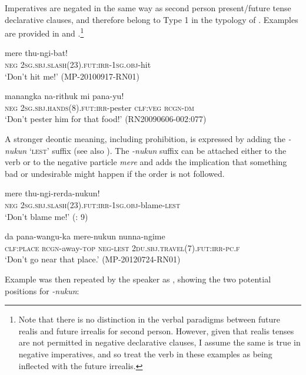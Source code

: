 \documentclass[output=paper,colorlinks,citecolor=brown]{langscibook}
\begin{document}
Imperatives are negated in the same way as second person present/future tense declarative clauses, and therefore belong to Type 1 in the typology of \citet{AuweraEtAl2013}. Examples are provided in  and .\footnote{Note that there is no distinction in the verbal paradigms between future realis and future irrealis for second person. However, given that realis tenses are not permitted in negative declarative clauses, I assume the same is true in negative imperatives, and so treat the verb in these examples as being inflected with the future irrealis.}

\ea\label{ex:mur:19}
    \gll  mere thu-ngi-bat!\\
         \textsc{neg} \textsc{2sg.sbj.slash(23).fut:irr-1sg.obj}{}-hit\\
    \glt ‘Don't hit me!’ (MP-20100917-RN01)
\z 

\ea\label{ex:mur:20}
    \gll manangka na{}-rithuk mi pana-yu!\\
         \textsc{neg} \textsc{2sg.sbj.hands(8).fut:irr}{}-pester \textsc{clf:veg} \textsc{rcgn-dm}\\
    \glt ‘Don’t pester him for that food!’ (RN20090606-002:077)
\z 
         
A stronger deontic meaning, including prohibition, is expressed by adding the \textit{{}-nukun} ‘\textsc{lest}’ suffix (see also ). The \textit{{}-nukun} suffix can be attached either to the verb  or to the negative particle \textit{mere}  and adds the implication that something bad or undesirable might happen if the order is not followed.


\ea\label{ex:mur:21}
    \gll mere thu{}-ngi-rerda-nukun!\\
          \textsc{neg} \textsc{2sg.sbj.slash(23).fut:irr-1sg.obj}{}-blame-\textsc{lest}\\
    \glt ‘Don’t blame me!’ (\citealt{FordMcCormack2011}: 9)
\z 
 
\ea\label{ex:mur:22}
    \gll da pana-wangu-ka mere{}-nukun nunna{}-ngime \\
         \textsc{clf:place} \textsc{rcgn}-away-\textsc{top} \textsc{neg}-\textsc{lest} \textsc{2du.sbj.travel(7)}\textsc{.fut:irr-pc.f} \\
    \glt ‘Don’t go near that place.’ (MP-20120724-RN01)
\z 

Example  was then repeated by the speaker as , showing the two potential positions for \textit{{}-nukun}:
\end{document}
